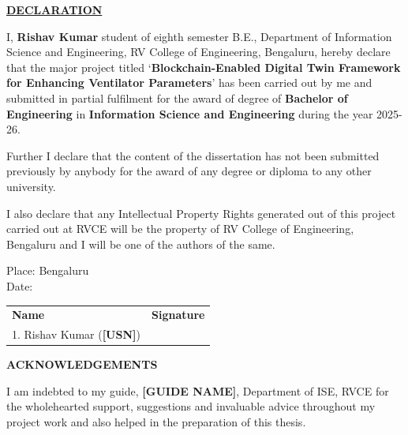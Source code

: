 \documentclass[12pt,a4paper,oneside]{report}
\begin{document}
\thispagestyle{empty}
\begin{center}\Huge\textbf{\underline{DECLARATION}}\end{center}
\vspace{0.3in}
\noindent I, \textbf{Rishav Kumar} student of eighth semester B.E., Department of Information Science and Engineering, RV College of Engineering, Bengaluru, hereby declare that the major project titled `\textbf{Blockchain-Enabled Digital Twin Framework for Enhancing Ventilator Parameters}' has been carried out by me and submitted in partial fulfilment for the award of degree of \textbf{Bachelor of Engineering} in \textbf{Information Science and Engineering} during the year 2025-26.
\vspace{0.2in}

\noindent Further I declare that the content of the dissertation has not been submitted previously by anybody for the award of any degree or diploma to any other university.
\vspace{0.2in}

\noindent I also declare that any Intellectual Property Rights generated out of this project carried out at RVCE will be the property of RV College of Engineering, Bengaluru and I will be one of the authors of the same.
\vspace{0.6in}

\noindent Place: Bengaluru\\
Date:
\vspace{0.6in}

\noindent \begin{tabular}{p{2.8in}p{2.5in}}
\textbf{Name} & \textbf{Signature}\\[0.3in]
1. Rishav Kumar (\textbf{[USN]}) & \\
\end{tabular}
\newpage

\thispagestyle{empty}
\begin{center}\Huge\textbf{ACKNOWLEDGEMENTS}\end{center}
\vspace{0.3in}
\noindent I am indebted to my guide, \textbf{[GUIDE NAME]}, Department of ISE, RVCE for the wholehearted support, suggestions and invaluable advice throughout my project work and also helped in the preparation of this thesis.
\vspace{0.15in}
\end{document}
